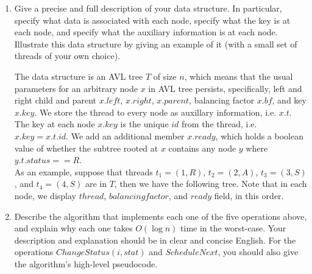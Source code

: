 \documentclass[11pt]{article}
\begin{document}
\begin{enumerate}
  \item Give a precise and full description of your data structure. In particular, specify what data is associated with each node, specify what the key is at each node, and specify what the auxiliary information is at each node. Illustrate this data structure by giving an example of it (with a small set of threads of your own choice).
  \begin{solution}
    The data structure is an AVL tree $T$ of size $n$, which means that the usual parameters for an arbitrary node $x$ in AVL tree persists, specifically, left and right child and parent $x.left$, $x.right$, $x.parent$, balancing factor $x.bf$, and key $x.key$. We store the thread to every node as auxillary information, i.e. $x.t$. The key at each node $x.key$ is the unique $id$ from the thread, i.e. $x.key = x.t.id$.  We add an additional member $x.ready$, which holds a boolean value of whether the subtree rooted at $x$ contains any node $y$ where $y.t.status == R$. \\
    As an example, suppose that threads $t_1 = (1, R)$, $t_2 = (2, A)$, $t_3 = (3, S)$, and $t_4 = (4, S)$ are in $T$, then we have the following tree. Note that in each node, we display $thread$, $balancing factor$, and $ready$ field, in this order.

    \begin{center}
    \end{center}

  \end{solution}
  \item Describe the algorithm that implements each one of the five operations above, and explain why each one takes $O(\log n)$ time in the worst-case. Your description and explanation should be in clear and concise English. For the operations $ChangeStatus(i,stat)$ and $ScheduleNext$, you should also give the algorithm’s high-level pseudocode.


\end{enumerate}
\end{document}
